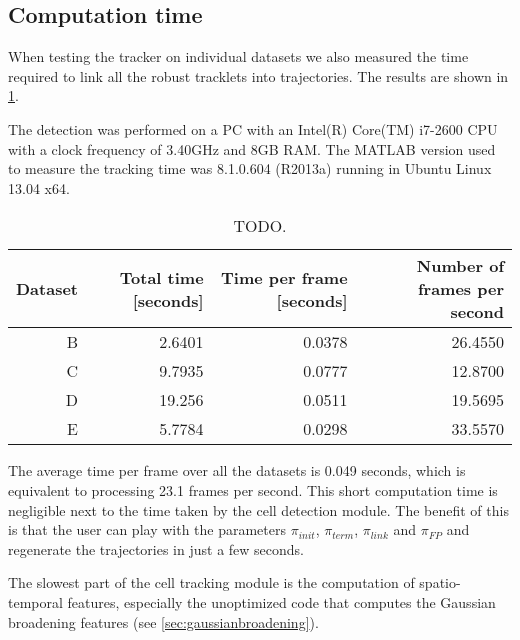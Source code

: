 		
		
	\subsection{Computation time \statusnew}
	
	When testing the tracker on individual datasets we also measured the time required to link all the robust tracklets into trajectories. The results are shown in \cref{tab:results_tracker_speed}. 
	
	The detection was performed on a PC with an Intel(R) Core(TM) i7-2600 CPU with a clock frequency of 3.40GHz and 8GB RAM. The MATLAB version used to measure the tracking time was 8.1.0.604 (R2013a) running in Ubuntu Linux 13.04 x64.
	
	\begin{table}[h]
		\centering
		\begin{tabular}{rrrr}
			Dataset & Total time [seconds] & Time per frame [seconds] & Number of frames per second \\
		\hline
			      B &               2.6401 &                   0.0378 &                     26.4550 \\
			      C &               9.7935 &                   0.0777 &                     12.8700 \\
			      D &               19.256 &                   0.0511 &                     19.5695 \\
			      E &               5.7784 &                   0.0298 &                     33.5570
		\end{tabular} 
		\caption{TODO.}
		\label{tab:results_tracker_speed}
	\end{table}
	
	The average time per frame over all the datasets is 0.049 seconds, which is equivalent to processing 23.1 frames per second. This short computation time is negligible next to the time taken by the cell detection module. The benefit of this is that the user can play with the parameters $\pi_{init}$, $\pi_{term}$, $\pi_{link}$ and $\pi_{FP}$ and regenerate the trajectories in just a few seconds.
	
	The slowest part of the cell tracking module is the computation of spatio-temporal features, especially the unoptimized code that computes the Gaussian broadening features (see \cref{sec:gaussianbroadening}).
